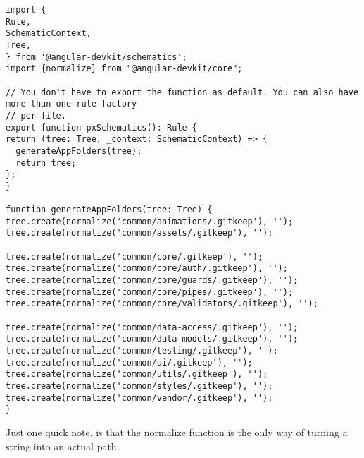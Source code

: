 \begin{lstlisting}
import {
Rule,
SchematicContext,
Tree,
} from '@angular-devkit/schematics';
import {normalize} from "@angular-devkit/core";

// You don't have to export the function as default. You can also have more than one rule factory
// per file.
export function pxSchematics(): Rule {
return (tree: Tree, _context: SchematicContext) => {
  generateAppFolders(tree);
  return tree;
};
}

function generateAppFolders(tree: Tree) {
tree.create(normalize('common/animations/.gitkeep'), '');
tree.create(normalize('common/assets/.gitkeep'), '');

tree.create(normalize('common/core/.gitkeep'), '');
tree.create(normalize('common/core/auth/.gitkeep'), '');
tree.create(normalize('common/core/guards/.gitkeep'), '');
tree.create(normalize('common/core/pipes/.gitkeep'), '');
tree.create(normalize('common/core/validators/.gitkeep'), '');

tree.create(normalize('common/data-access/.gitkeep'), '');
tree.create(normalize('common/data-models/.gitkeep'), '');
tree.create(normalize('common/testing/.gitkeep'), '');
tree.create(normalize('common/ui/.gitkeep'), '');
tree.create(normalize('common/utils/.gitkeep'), '');
tree.create(normalize('common/styles/.gitkeep'), '');
tree.create(normalize('common/vendor/.gitkeep'), '');
}
\end{lstlisting}

Just one quick note, is that the normalize function is the only way of turning
a string into an actual path.

